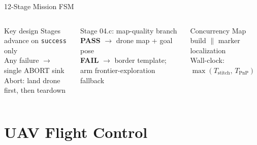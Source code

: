 \documentclass[aspectratio=169,10pt]{beamer}
\begin{document}
\begin{frame}{12-Stage Mission FSM}
\begin{columns}[T]
      \vspace{4pt}
      \begin{block}{Key design}
        \small Stages advance on \texttt{success} only\\
        Any failure $\to$ single ABORT sink\\
        Abort: land drone first, then teardown
      \end{block}
      \vspace{4pt}
      \begin{alertblock}{Stage 04.c: map-quality branch}
        \small \textbf{PASS} $\to$ drone map + goal pose\\[2pt]
        \textbf{FAIL} $\to$ border template; arm frontier-exploration fallback
      \end{alertblock}
      \vspace{4pt}
      \begin{block}{Concurrency}
        \small Map build $\parallel$ marker localization\\
        Wall-clock: $\max(T_\text{stitch},\,T_\text{PnP})$
      \end{block}
  \end{columns}
\end{frame}

\section{UAV Flight Control}
\end{document}
